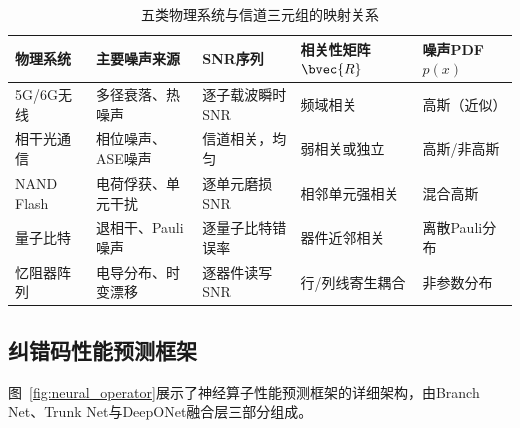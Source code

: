 \begin{table}[htbp]
\centering
\caption{五类物理系统与信道三元组的映射关系}
\label{tab:channel_mapping}
\setlength{\tabcolsep}{5pt}
\begin{tabular}{@{}L{2.2cm}L{3.0cm}L{2.8cm}L{2.8cm}L{2.4cm}@{}}
\toprule
\textbf{物理系统} & \textbf{主要噪声来源} & \textbf{SNR序列} & \textbf{相关性矩阵$\bvec{R}$} & \textbf{噪声PDF $p(x)$} \\
\midrule
5G/6G无线 & 多径衰落、热噪声 & 逐子载波瞬时SNR & 频域相关 & 高斯（近似） \\
相干光通信 & 相位噪声、ASE噪声 & 信道相关，均匀 & 弱相关或独立 & 高斯/非高斯 \\
NAND Flash & 电荷俘获、单元干扰 & 逐单元磨损SNR & 相邻单元强相关 & 混合高斯 \\
量子比特 & 退相干、Pauli噪声 & 逐量子比特错误率 & 器件近邻相关 & 离散Pauli分布 \\
忆阻器阵列 & 电导分布、时变漂移 & 逐器件读写SNR & 行/列线寄生耦合 & 非参数分布 \\
\bottomrule
\end{tabular}
\end{table}

\subsection{纠错码性能预测框架}\label{sec:predictor}

图~\ref{fig:neural_operator}展示了神经算子性能预测框架的详细架构，由Branch Net、Trunk Net与DeepONet融合层三部分组成。


